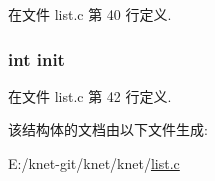 在文件 list.\+c 第 40 行定义.

\hypertarget{struct__dlist__t_a795ea50921b36311ffd5e7baa2ef1f7e}{}
\subsubsection[{init}]{\setlength{\rightskip}{0pt plus 5cm}int init}\label{struct__dlist__t_a795ea50921b36311ffd5e7baa2ef1f7e}


在文件 list.\+c 第 42 行定义.



该结构体的文档由以下文件生成\+:\begin{DoxyCompactItemize}
\item 
E\+:/knet-\/git/knet/knet/\hyperlink{list_8c}{list.\+c}\end{DoxyCompactItemize}
